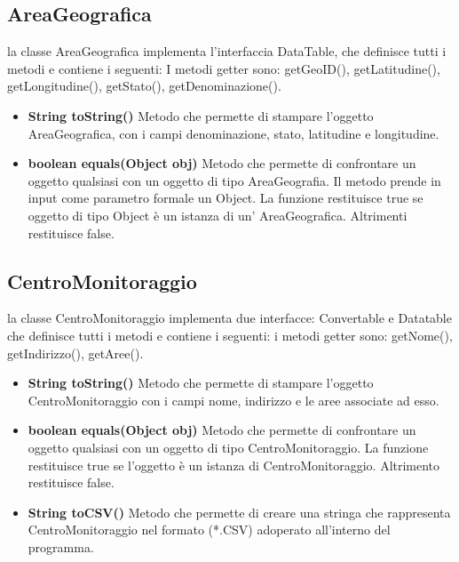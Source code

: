 \documentclass[a4paper, 12pt]{report}
\begin{document}
			\subsection{AreaGeografica}
			la classe AreaGeografica implementa l'interfaccia DataTable, che definisce tutti i metodi e contiene i seguenti:
			I metodi getter sono: getGeoID(), getLatitudine(), getLongitudine(), getStato(), getDenominazione().
			\begin{itemize}
				\item \textbf{String toString()}
				Metodo che permette di stampare l'oggetto AreaGeografica, con i campi denominazione, stato, latitudine e longitudine.
				\item \textbf{boolean equals(Object obj)}
				Metodo che permette di confrontare un oggetto qualsiasi con un oggetto di tipo AreaGeografia. Il metodo prende in input come parametro formale un Object. La funzione restituisce true se oggetto di tipo Object è un istanza di un' AreaGeografica. Altrimenti restituisce false. 
			\end{itemize}

			\subsection{CentroMonitoraggio}
			la classe CentroMonitoraggio implementa due interfacce: Convertable e Datatable che definisce tutti i metodi e contiene i seguenti:
			i metodi getter sono: getNome(), getIndirizzo(), getAree().
			\begin{itemize}
				\item \textbf{String toString()}
				Metodo che permette di stampare l'oggetto CentroMonitoraggio con i campi nome, indirizzo e le aree associate ad esso.
				\item \textbf{boolean equals(Object obj)}
				Metodo che permette di confrontare un oggetto qualsiasi con un oggetto di tipo CentroMonitoraggio. La funzione restituisce true se l'oggetto è un istanza di CentroMonitoraggio. Altrimento restituisce false.
				\item \textbf{String toCSV()}
				Metodo che permette di creare una stringa che rappresenta CentroMonitoraggio nel formato (*.CSV) adoperato all'interno del programma.
			\end{itemize}
\end{document}
